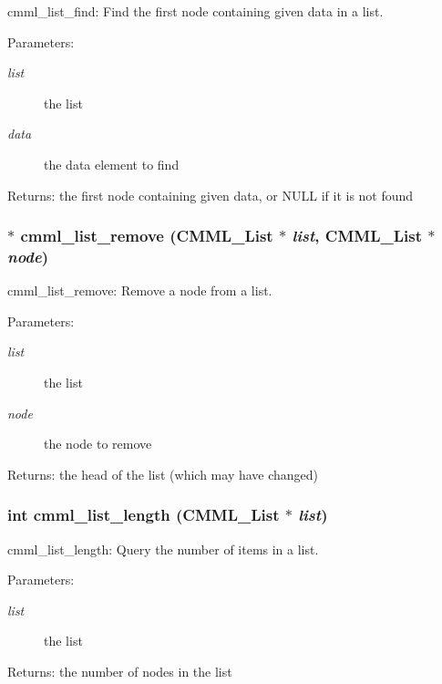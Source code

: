 cmml\_\-list\_\-find: Find the first node containing given data in a list.

\begin{Desc}
\item[Parameters:]
\begin{description}
\item[{\em list}]the list \item[{\em data}]the data element to find\end{description}
\end{Desc}
\begin{Desc}
\item[Returns:]the first node containing given data, or NULL if it is not found \end{Desc}
\subsubsection{$\ast$ cmml\_\-list\_\-remove ({\bf CMML\_\-List} $\ast$ {\em list}, {\bf CMML\_\-List} $\ast$ {\em node})}\label{cmml_8h_a91}


cmml\_\-list\_\-remove: Remove a node from a list.

\begin{Desc}
\item[Parameters:]
\begin{description}
\item[{\em list}]the list \item[{\em node}]the node to remove\end{description}
\end{Desc}
\begin{Desc}
\item[Returns:]the head of the list (which may have changed) \end{Desc}
\subsubsection{\setlength{\rightskip}{0pt plus 5cm}int cmml\_\-list\_\-length ({\bf CMML\_\-List} $\ast$ {\em list})}\label{cmml_8h_a92}


cmml\_\-list\_\-length: Query the number of items in a list.

\begin{Desc}
\item[Parameters:]
\begin{description}
\item[{\em list}]the list\end{description}
\end{Desc}
\begin{Desc}
\item[Returns:]the number of nodes in the list \end{Desc}
